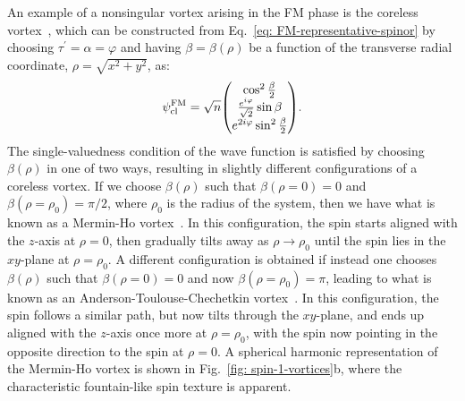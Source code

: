An example of a nonsingular vortex arising in the FM phase is the coreless
vortex~\cite{Martikainen2002, Leanhardt2003}, which can be constructed from
Eq.~\eqref{eq: FM-representative-spinor} by choosing \(\tau^\prime = \alpha
= \varphi \) and having \(\beta = \beta(\rho)\) be a function of the transverse
radial coordinate, \(\rho =\sqrt{x^2 + y^2}\), as:
\begin{align}
    \psi^\text{FM}_\text{cl} = \sqrt{n}\mqty(
    \cos^2\frac{\beta}{2} \\
    \frac{e^{i\varphi}}{\sqrt{2}}\sin\beta \\
    e^{2i\varphi}\sin^2\frac{\beta}{2}
    ).
\end{align}
The single-valuedness condition of the wave function is satisfied by choosing
\(\beta(\rho) \) in one of two ways, resulting in slightly different
configurations of a coreless vortex.
If we choose \(\beta(\rho)\) such that \(\beta(\rho=0) = 0\) and
\(\beta(\rho=\rho_0) = \pi/2 \), where \(\rho_0\) is the radius of the system,
then we have what is known as a Mermin-Ho vortex~\cite{Mermin1976,
Mizushima2002a}.
In this configuration, the spin starts aligned with the \(z\)-axis at
\(\rho=0\), then gradually tilts away as \(\rho \rightarrow \rho_0\) until
the spin lies in the \(xy\)-plane at \(\rho=\rho_0\).
A different configuration is obtained if instead one chooses \(\beta(\rho)\)
such that \(\beta(\rho=0) = 0\) and now \(\beta(\rho=\rho_0) = \pi \), leading
to what is known as an Anderson-Toulouse-Chechetkin
vortex~\cite{Chechetkin1976, Anderson1977}.
In this configuration, the spin follows a similar path, but now tilts through
the \(xy\)-plane, and ends up aligned with the \(z\)-axis once more at
\(\rho=\rho_0\), with the spin now pointing in the opposite direction to the
spin at \(\rho=0\).
A spherical harmonic representation of the Mermin-Ho vortex is shown in
Fig.~\ref{fig: spin-1-vortices}b, where the characteristic fountain-like
spin texture is apparent.

